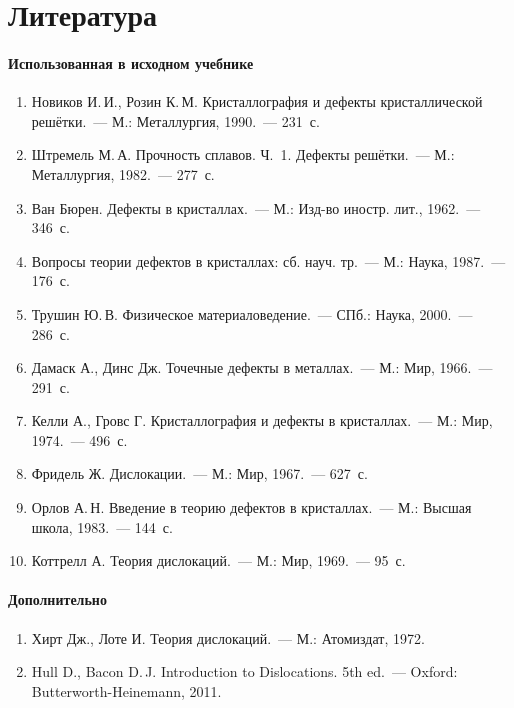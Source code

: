 \section*{Литература}

{\small
\paragraph{Использованная в исходном учебнике}
\begin{enumerate}[label=\arabic*.]
\item Новиков И.\,И., Розин К.\,М. Кристаллография и дефекты
кристаллической решётки.~— М.: Металлургия, 1990.~— 231~с.
\item Штремель М.\,А. Прочность сплавов. Ч.~1. Дефекты решётки.~— М.:
Металлургия, 1982.~— 277~с.
\item Ван Бюрен. Дефекты в кристаллах.~— М.: Изд-во иностр. лит., 1962.~— 346~с.
\item Вопросы теории дефектов в кристаллах: сб. науч. тр.~— М.: Наука, 1987.~— 176~с.
\item Трушин Ю.\,В. Физическое материаловедение.~— СПб.: Наука, 2000.~— 286~с.
\item Дамаск А., Динс Дж. Точечные дефекты в металлах.~— М.: Мир, 1966.~— 291~с.
\item Келли А., Гровс Г. Кристаллография и дефекты в кристаллах.~— М.:
Мир, 1974.~— 496~с.
\item Фридель Ж. Дислокации.~— М.: Мир, 1967.~— 627~с.
\item Орлов А.\,Н. Введение в теорию дефектов в кристаллах.~— М.: Высшая
школа, 1983.~— 144~с.
\item Коттрелл А. Теория дислокаций.~— М.: Мир, 1969.~— 95~с.
\end{enumerate}

\paragraph{Дополнительно}
\begin{enumerate}[label=\arabic*., resume]
\item Хирт Дж., Лоте И. Теория дислокаций.~— М.: Атомиздат, 1972.
\item Hull D., Bacon D.\,J. Introduction to Dislocations. 5th ed.~—
Oxford: Butterworth-Heinemann, 2011.
\end{enumerate}
}
